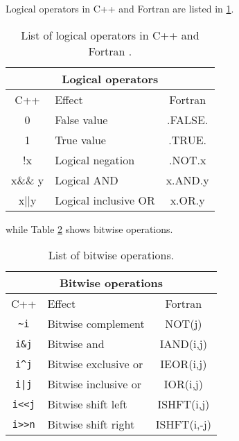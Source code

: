%
Logical operators in C++ and Fortran  are listed in \ref{tab:cexpressions2}.
\begin{table}
\begin{center}
\begin{tabular}{|clc|} \hline
\multicolumn{3}{|c|}{Logical operators}\\ \hline
C++  & Effect & Fortran \\ \hline
0 & False value & .FALSE. \\
1 & True value & .TRUE. \\
!x & Logical negation & .NOT.x\\
x\&\& y & Logical AND   &        x.AND.y\\
x||y   & Logical inclusive OR    & x.OR.y \\
\hline
\end{tabular}
\caption{List of logical operators in C++ and Fortran .\label{tab:cexpressions2}}
\end{center}
\end{table}
%
while Table \ref{tab:cexpressions3} shows bitwise operations.
\begin{table}
\begin{center}
\begin{tabular}{|clc|} \hline
\multicolumn{3}{|c|}{Bitwise operations}\\ \hline
C++ & Effect & Fortran   \\ \hline
\verb?~i?   &Bitwise complement       &NOT(j)  \\
\verb?i&j?     &Bitwise and       &IAND(i,j)   \\
 \verb?i^j?    & Bitwise exclusive or      &IEOR(i,j)   \\
\verb?i|j? & Bitwise inclusive or & IOR(i,j) \\
\verb?i<<j? & Bitwise shift left & ISHFT(i,j) \\
\verb?i>>n? & Bitwise shift right & ISHFT(i,-j) \\
\hline
\end{tabular}
\caption{List of bitwise operations. \label{tab:cexpressions3}}
\end{center}
\end{table}
 
